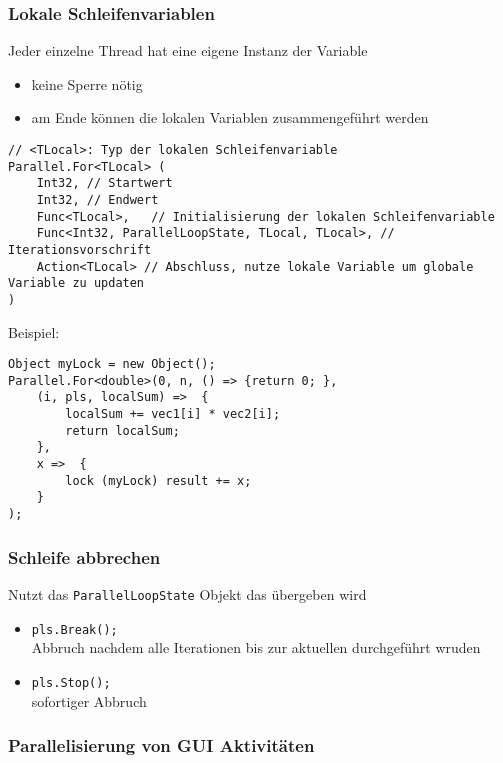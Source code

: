 \subsubsection{Lokale Schleifenvariablen}

Jeder einzelne Thread hat eine eigene Instanz der Variable

\begin{itemize}
\item keine Sperre nötig
\item am Ende können die lokalen Variablen zusammengeführt werden
\end{itemize}

\begin{lstlisting}[language={[Sharp]C}]
// <TLocal>: Typ der lokalen Schleifenvariable
Parallel.For<TLocal> (
	Int32, // Startwert
	Int32, // Endwert
	Func<TLocal>,	// Initialisierung der lokalen Schleifenvariable
	Func<Int32, ParallelLoopState, TLocal, TLocal>,	// Iterationsvorschrift
	Action<TLocal> // Abschluss, nutze lokale Variable um globale Variable zu updaten
) 
\end{lstlisting}
Beispiel: 
\begin{lstlisting}[language={[Sharp]C}]
Object myLock = new Object();
Parallel.For<double>(0, n, () => {return 0; }, 
	(i, pls, localSum) =>  {
		localSum += vec1[i] * vec2[i];
		return localSum;
	},
	x =>  {
		lock (myLock) result += x;
	}
);
\end{lstlisting}

\subsubsection{Schleife abbrechen}
Nutzt das \lstinline`ParallelLoopState` Objekt das übergeben wird

\begin{itemize}
\item \lstinline`pls.Break();`\\
Abbruch nachdem alle Iterationen bis zur aktuellen durchgeführt wruden
\item \lstinline`pls.Stop();`\\
sofortiger Abbruch
\end{itemize}

\subsubsection{Parallelisierung von GUI Aktivitäten}

